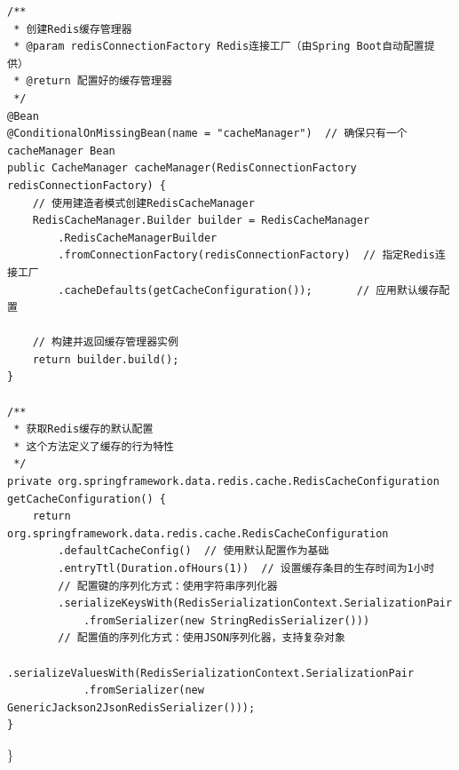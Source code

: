 \begin{verbatim}
/**
 * 创建Redis缓存管理器
 * @param redisConnectionFactory Redis连接工厂（由Spring Boot自动配置提供）
 * @return 配置好的缓存管理器
 */
@Bean
@ConditionalOnMissingBean(name = "cacheManager")  // 确保只有一个cacheManager Bean
public CacheManager cacheManager(RedisConnectionFactory redisConnectionFactory) {
    // 使用建造者模式创建RedisCacheManager
    RedisCacheManager.Builder builder = RedisCacheManager
        .RedisCacheManagerBuilder
        .fromConnectionFactory(redisConnectionFactory)  // 指定Redis连接工厂
        .cacheDefaults(getCacheConfiguration());       // 应用默认缓存配置
    
    // 构建并返回缓存管理器实例
    return builder.build();
}

/**
 * 获取Redis缓存的默认配置
 * 这个方法定义了缓存的行为特性
 */
private org.springframework.data.redis.cache.RedisCacheConfiguration getCacheConfiguration() {
    return org.springframework.data.redis.cache.RedisCacheConfiguration
        .defaultCacheConfig()  // 使用默认配置作为基础
        .entryTtl(Duration.ofHours(1))  // 设置缓存条目的生存时间为1小时
        // 配置键的序列化方式：使用字符串序列化器
        .serializeKeysWith(RedisSerializationContext.SerializationPair
            .fromSerializer(new StringRedisSerializer()))
        // 配置值的序列化方式：使用JSON序列化器，支持复杂对象
        .serializeValuesWith(RedisSerializationContext.SerializationPair
            .fromSerializer(new GenericJackson2JsonRedisSerializer()));
}
\end{verbatim}

\}

